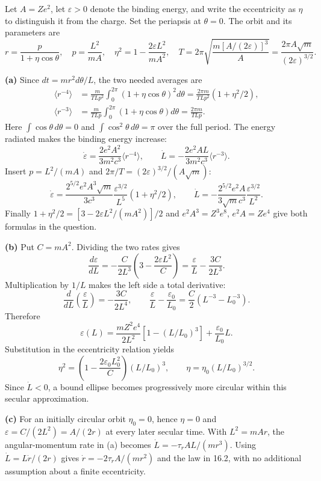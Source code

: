 Let $A=Ze^2$, let $\varepsilon>0$ denote the binding energy, and
write the eccentricity as $\eta$ to distinguish it from the charge.
Set the periapsis at $\theta=0$. The orbit and its parameters are
\[
r=\frac p{1+\eta\cos\theta},\quad
p=\frac{L^2}{mA},\quad
\eta^2=1-\frac{2\varepsilon L^2}{mA^2},\quad
T=2\pi\sqrt{\frac{m[A/(2\varepsilon)]^3}{A}}
=\frac{2\pi A\sqrt m}{(2\varepsilon)^{3/2}}.
\]

\textbf{(a)} Since $dt=mr^2d\theta/L$, the two needed averages are
\begin{align*}
\langle r^{-4}\rangle
&=\frac m{TLp^2}\int_0^{2\pi}(1+\eta\cos\theta)^2d\theta
=\frac{2\pi m}{TLp^2}(1+\eta^2/2),\\
\langle r^{-3}\rangle
&=\frac m{TLp}\int_0^{2\pi}(1+\eta\cos\theta)d\theta
=\frac{2\pi m}{TLp}.
\end{align*}
Here $\int\cos\theta\,d\theta=0$ and
$\int\cos^2\theta\,d\theta=\pi$ over the full period.
The energy radiated makes the binding energy increase:
\[
\dot\varepsilon=\frac{2e^2A^2}{3m^2c^3}\langle r^{-4}\rangle,
\qquad
\dot L=-\frac{2e^2AL}{3m^2c^3}\langle r^{-3}\rangle.
\]
Insert $p=L^2/(mA)$ and $2\pi/T=(2\varepsilon)^{3/2}/(A\sqrt m)$:
\[
\dot\varepsilon=
\frac{2^{5/2}e^2A^3\sqrt m}{3c^3}
\frac{\varepsilon^{3/2}}{L^5}(1+\eta^2/2),\qquad
\dot L=-\frac{2^{5/2}e^2A}{3\sqrt m c^3}
\frac{\varepsilon^{3/2}}{L^2}.
\]
Finally $1+\eta^2/2=[3-2\varepsilon L^2/(mA^2)]/2$
and $e^2A^3=Z^3e^8$, $e^2A=Ze^4$ give both formulas in the question.

\textbf{(b)} Put $C=mA^2$. Dividing the two rates gives
\[
\frac{d\varepsilon}{dL}=
-\frac C{2L^3}\left(3-\frac{2\varepsilon L^2}C\right)
=\frac\varepsilon L-\frac{3C}{2L^3}.
\]
Multiplication by $1/L$ makes the left side a total derivative:
\[
\frac d{dL}\left(\frac\varepsilon L\right)
=-\frac{3C}{2L^4},\qquad
\frac\varepsilon L-\frac{\varepsilon_0}{L_0}
=\frac C2(L^{-3}-L_0^{-3}).
\]
Therefore
\[
\boxed{\varepsilon(L)=\frac{mZ^2e^4}{2L^2}
\left[1-(L/L_0)^3\right]+\frac{\varepsilon_0}{L_0}L.}
\]
Substitution in the eccentricity relation yields
\[
\eta^2=\left(1-\frac{2\varepsilon_0L_0^2}{C}\right)(L/L_0)^3,
\qquad
\boxed{\eta=\eta_0(L/L_0)^{3/2}.}
\]
Since $\dot L<0$, a bound ellipse becomes progressively more circular
within this secular approximation.

\textbf{(c)} For an initially circular orbit $\eta_0=0$, hence
$\eta=0$ and $\varepsilon=C/(2L^2)=A/(2r)$ at every later secular time.
With $L^2=mAr$, the angular-momentum rate in (a) becomes
$\dot L=-\tau_r AL/(mr^3)$. Using $\dot L=L\dot r/(2r)$ gives
$\dot r=-2\tau_r A/(mr^2)$ and the law in 16.2, with no additional
assumption about a finite eccentricity.

